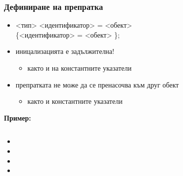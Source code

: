 \documentclass{beamer}
\begin{document}
\newcommand{\labeledcell}[2]{
  \node [cell,label=above:{\tt{#1}}] {\tt{#2}};
}

\begin{frame}
  \frametitle{Дефиниране на препратка}

  \begin{itemize}[<+->]
  \item{} <тип>\tta{\&} <идентификатор> \tta= <обект>\\
    \hspace{5ex} \{\tta{, \&}<идентификатор> \tta= <обект> \}\tta;
  \item иницализацията е \alert{задължителна}!
    \begin{itemize}
    \item както и на константните указатели
    \end{itemize}
  \item препратката \alert{не може} да се пренасочва към друг обект
    \begin{itemize}
    \item както и константните указатели
    \end{itemize}
  \end{itemize}
  \onslide<+->
  \textbf{Пример:}
  \begin{columns}[T,onlytextwidth]
    \begin{column}{.5\textwidth}
      \begin{itemize}[<+->]
      \item {}
      \item {}
      \item {}
      \item {}
      \end{itemize}
    \end{column}
    \begin{column}{.5\textwidth}
      \only<7>{\tikz{\labeledcell{x\phantom{,a}}3}}
      \only<8-10>{\tikz{\labeledcell{x,a}3}}
      \only<11>{\tikz{\labeledcell{x,a}8}}
      \hspace{5ex}
      \only<8>{\tikz{\labeledcell{b\phantom{,b}}3}}
      \only<9->{\tikz{\labeledcell{b,c}3}}
    \end{column}
  \end{columns}
\end{frame}
\end{document}
